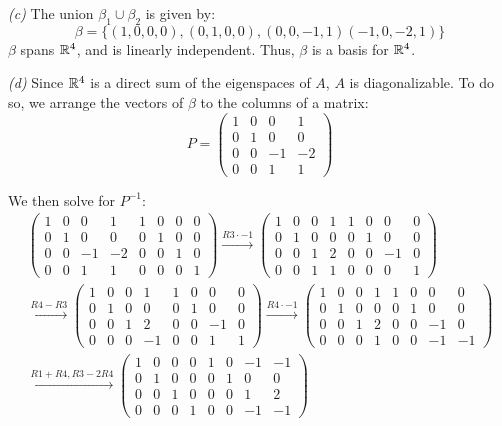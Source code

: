 \documentclass[12pt, a4paper]{article}
\begin{document}
\textit{(c)} The union $\beta_1 \cup \beta_2$ is given by:
\[
    \beta = \{
        (1, 0, 0, 0),
        (0, 1, 0, 0),
        (0, 0, -1, 1)
        (-1, 0, -2, 1)
    \}
\]
$\beta$ spans $\mathbb{R}^4$, and is linearly independent. Thus, $\beta$
is a basis for $\mathbb{R}^4$.

\textit{(d)} Since $\mathbb{R}^4$ is a direct sum of the eigenspaces of $A$,
$A$ is diagonalizable. To do so, we arrange the vectors of $\beta$
to the columns of a matrix:
\[
    P = \begin{pmatrix}
        1 & 0 & 0 & 1 \\
        0 & 1 & 0 & 0 \\
        0 & 0 &-1 &-2 \\
        0 & 0 & 1 & 1
    \end{pmatrix}
\]

\newpage
We then solve for $P^{-1}$:
\begin{gather*}
    \left(\begin{array}{cccc|cccc}
        1 & 0 & 0 & 1 & 1 & 0 & 0 & 0 \\
        0 & 1 & 0 & 0 & 0 & 1 & 0 & 0 \\
        0 & 0 &-1 &-2 & 0 & 0 & 1 & 0 \\
        0 & 0 & 1 & 1 & 0 & 0 & 0 & 1
    \end{array}\right) \xrightarrow{R3 \cdot -1}
    \left(\begin{array}{cccc|cccc}
        1 & 0 & 0 & 1 & 1 & 0 & 0 & 0 \\
        0 & 1 & 0 & 0 & 0 & 1 & 0 & 0 \\
        0 & 0 & 1 & 2 & 0 & 0 &-1 & 0 \\
        0 & 0 & 1 & 1 & 0 & 0 & 0 & 1
    \end{array}\right) \\ \xrightarrow{R4 - R3}
    \left(\begin{array}{cccc|cccc}
        1 & 0 & 0 & 1 & 1 & 0 & 0 & 0 \\
        0 & 1 & 0 & 0 & 0 & 1 & 0 & 0 \\
        0 & 0 & 1 & 2 & 0 & 0 &-1 & 0 \\
        0 & 0 & 0 &-1 & 0 & 0 & 1 & 1
    \end{array}\right) \xrightarrow{R4 \cdot -1}
    \left(\begin{array}{cccc|cccc}
        1 & 0 & 0 & 1 & 1 & 0 & 0 & 0 \\
        0 & 1 & 0 & 0 & 0 & 1 & 0 & 0 \\
        0 & 0 & 1 & 2 & 0 & 0 &-1 & 0 \\
        0 & 0 & 0 & 1 & 0 & 0 &-1 &-1
    \end{array}\right) \\ \xrightarrow{R1 + R4, R3 - 2R4}
    \left(\begin{array}{cccc|cccc}
        1 & 0 & 0 & 0 & 1 & 0 &-1 &-1 \\
        0 & 1 & 0 & 0 & 0 & 1 & 0 & 0 \\
        0 & 0 & 1 & 0 & 0 & 0 & 1 & 2 \\
        0 & 0 & 0 & 1 & 0 & 0 &-1 &-1
    \end{array}\right)
\end{gather*}
\end{document}
